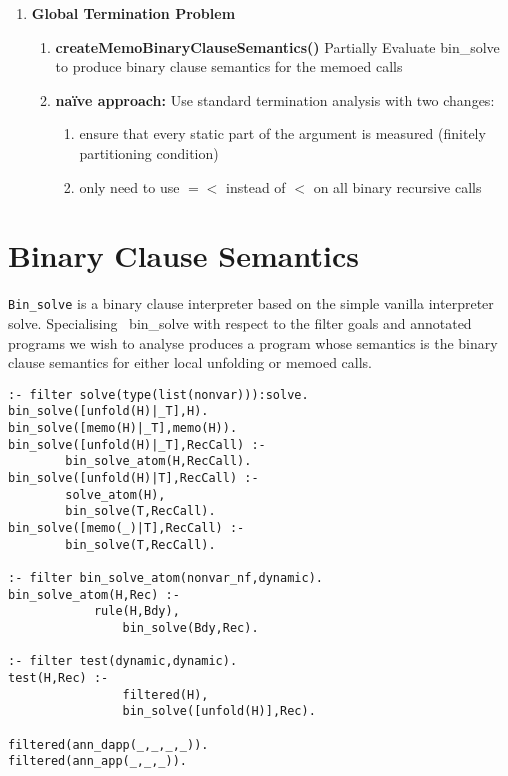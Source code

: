 \documentclass[12pt,twoside]{article}
\begin{document}
\begin{enumerate}
\begin{enumerate}
  \end{enumerate}
  \item {\bf Global Termination Problem}
    \begin{enumerate}
      \item {\bf createMemoBinaryClauseSemantics()} Partially Evaluate bin\_solve to produce binary clause semantics for the memoed calls
        \item {\bf na{\"i}ve approach:} Use standard termination analysis with two changes:
          \begin{enumerate}
          \item ensure that every static part of the argument is measured (finitely partitioning condition)
          \item only need to use $=<$ instead of $<$ on all binary recursive calls
          \end{enumerate}
          
      
    \end{enumerate}

\end{enumerate}



\section{Binary Clause Semantics}
{\tt Bin\_solve} is a binary clause interpreter based on the simple vanilla interpreter solve. Specialising {\ bin\_solve} with respect to the filter goals and annotated programs we wish to analyse produces a program whose semantics is the binary clause semantics for either local unfolding or memoed calls.

\begin{verbatim}
:- filter solve(type(list(nonvar))):solve.
bin_solve([unfold(H)|_T],H).
bin_solve([memo(H)|_T],memo(H)).
bin_solve([unfold(H)|_T],RecCall) :-
        bin_solve_atom(H,RecCall).
bin_solve([unfold(H)|T],RecCall) :-
        solve_atom(H),
        bin_solve(T,RecCall).
bin_solve([memo(_)|T],RecCall) :-
        bin_solve(T,RecCall).
               
:- filter bin_solve_atom(nonvar_nf,dynamic).
bin_solve_atom(H,Rec) :-
            rule(H,Bdy),
                bin_solve(Bdy,Rec).

:- filter test(dynamic,dynamic).
test(H,Rec) :-
                filtered(H),
                bin_solve([unfold(H)],Rec).

filtered(ann_dapp(_,_,_,_)).
filtered(ann_app(_,_,_)).
\end{verbatim}
\end{document}
